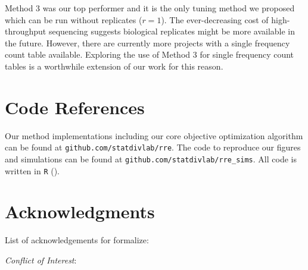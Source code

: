 \documentclass[oupdraft]{bio}
\begin{document}
Method 3 was our top performer and it is the only tuning method we proposed which can be run without replicates ($r = 1$).  The ever-decreasing cost of high-throughput sequencing suggests biological replicates might be more available in the future.  However, there are currently more projects with a single frequency count table available.  Exploring the use of Method 3 for single frequency count tables is a worthwhile extension of our work for this reason.

\section{Code References}
\label{sec:code}
Our method implementations including our core objective optimization algorithm can be found at \texttt{github.com/statdivlab/rre}.  The code to reproduce our figures and simulations can be found at \texttt{github.com/statdivlab/rre\_sims}.  All code is written in \texttt{R} (\citet{r_project}).


\section*{Acknowledgments}
List of acknowledgements for formalize:

{\it Conflict of Interest}: 



\end{document}
